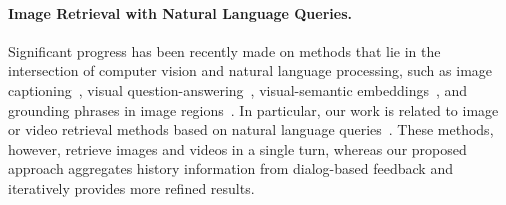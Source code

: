 \paragraph{Image Retrieval with Natural Language Queries.}
Significant progress has been recently made on methods that lie in the intersection of computer vision and natural language processing, such as image captioning~\cite{vinyals2015show,rennie2016self}, visual question-answering~\cite{antol2015vqa,tapaswi2016movieqa}, visual-semantic embeddings~\cite{frome2013devise,wang2016learning},  and grounding phrases in image regions~\cite{rohrbach2016grounding,plummer2015flickr30k}. In particular, our work is related to image or video retrieval methods based on natural language queries~\cite{tellex2009towards,barbu2013saying,li2017person,hu2016natural}. 
These methods, however, retrieve images and videos in a single turn, whereas our proposed approach aggregates history information from dialog-based feedback and iteratively provides more refined results.

